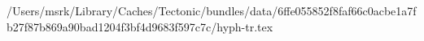 /Users/msrk/Library/Caches/Tectonic/bundles/data/6ffe055852f8faf66c0acbe1a7fb27f87b869a90bad1204f3bf4d9683f597c7c/hyph-tr.tex